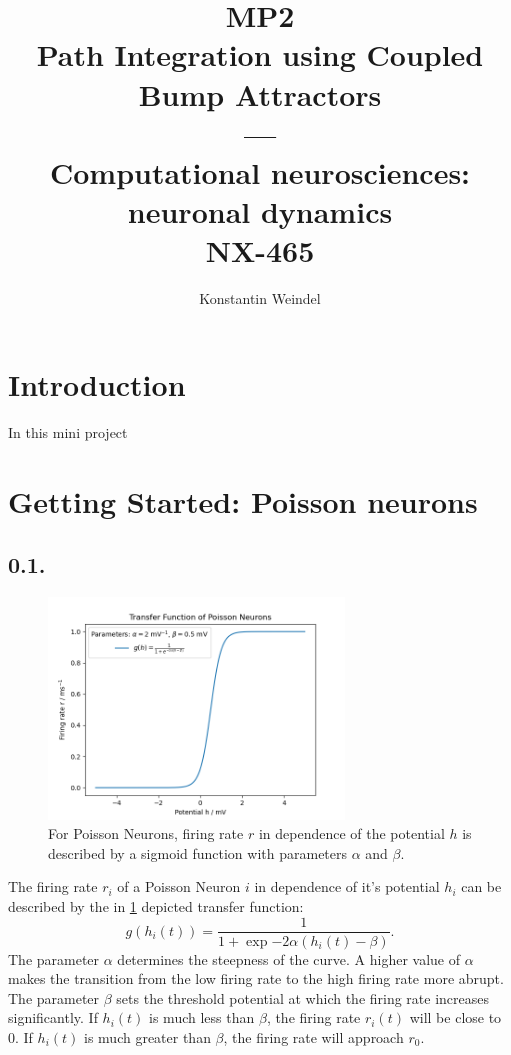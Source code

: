 \documentclass{article}
\title{MP2\\Path Integration using Coupled Bump Attractors\\---\\Computational neurosciences: neuronal dynamics\\NX-465}
\author{Konstantin Weindel}
\begin{document}
\maketitle


\section*{Introduction}
In this mini project 

\section{Getting Started: Poisson neurons}
\subsection*{0.1.}
\begin{figure}[h]
    \centering
    \includegraphics[width=0.7\textwidth]{figures/0.1.transfer_function.png}
    \caption{For Poisson Neurons, firing rate \(r\) in dependence of the potential \(h\) is described by a sigmoid function with parameters \(\alpha\) and \(\beta\).}
    \label{fig:01}
\end{figure}

The firing rate \(r_i\) of a Poisson Neuron \(i\) in dependence of it's potential \(h_i\) can be described by the in \cref{fig:01} depicted transfer function:
\[g(h_i(t)) = \frac{1}{1+\exp{-2\alpha(h_i(t)-\beta)}}.\]
The parameter $\alpha$ determines the steepness of the curve. A higher value of $\alpha$ makes the transition from the low firing rate to the high firing rate more abrupt.
The parameter $\beta$ sets the threshold potential at which the firing rate increases significantly. If $h_i(t)$ is much less than $\beta$, the firing rate $r_i(t)$ will be close to 0. If $h_i(t)$ is much greater than $\beta$, the firing rate will approach $r_0$.
\end{document}
